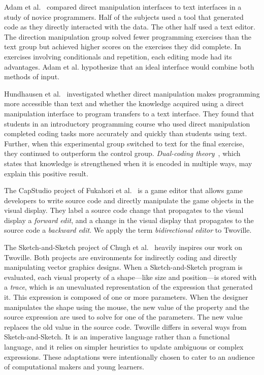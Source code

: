 Adam et al.~\cite{adam19dm} compared direct manipulation interfaces to text interfaces in a study of novice programmers. Half of the subjects used a tool that generated code as they directly interacted with the data. The other half used a text editor. The direction manipulation group solved fewer programming exercises than the text group but achieved higher scores on the exercises they did complete. In exercises involving conditionals and repetition, each editing mode had its advantages. Adam et al. hypothesize that an ideal interface would combine both methods of input.

Hundhausen et al.~\cite{hundhausen09dm} investigated whether direct manipulation makes programming more accessible than text and whether the knowledge acquired using a direct manipulation interface to program transfers to a text interface. They found that students in an introductory programming course who used direct manipulation completed coding tasks more accurately and quickly than students using text. Further, when this experimental group switched to text for the final exercise, they continued to outperform the control group. \textit{Dual-coding theory}~\cite{clark1991dual}, which states that knowledge is strengthened when it is encoded in multiple ways, may explain this positive result.

The CapStudio project of Fukahori et al.~\cite{fukahori14capstudio} is a game editor that allows game developers to write source code and directly manipulate the game objects in the visual display. They label a source code change that propagates to the visual display a {\em forward edit}, and a change in the visual display that propagates to the source code a {\em backward edit}. We apply the term {\em bidirectional editor} to Twoville.

The Sketch-and-Sketch project of Chugh et al.~\cite{chugh16dm} heavily inspires our work on Twoville. Both projects are environments for indirectly coding and directly manipulating vector graphics designs. When a Sketch-and-Sketch program is evaluated, each visual property of a shape---like size and position---is stored with a \textit{trace}, which is an unevaluated representation of the expression that generated it. This expression is composed of one or more parameters. When the designer manipulates the shape using the mouse, the new value of the property and the source expression are used to solve for one of the parameters. The new value replaces the old value in the source code. Twoville differs in several ways from Sketch-and-Sketch. It is an imperative language rather than a functional language, and it relies on simpler heuristics to update ambiguous or complex expressions. These adaptations were intentionally chosen to cater to an audience of computational makers and young learners.
